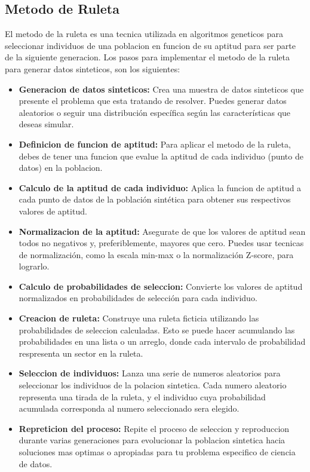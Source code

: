 \documentclass[12pt]{article}
\begin{document}
\subsection{Metodo de Ruleta}
El metodo de la ruleta es una tecnica utilizada en algoritmos geneticos para seleccionar individuos de una poblacion en funcion de su aptitud para ser parte de la siguiente generacion. Los pasos para implementar el metodo de la ruleta para generar datos sinteticos, son los siguientes:
\begin{itemize}
    \item \textbf{Generacion de datos sinteticos:} Crea una muestra de datos sinteticos que presente el problema que esta tratando de resolver. Puedes generar datos aleatorios o seguir una distribución específica según las características que deseas simular.
    \item \textbf{Definicion de funcion de aptitud:} Para aplicar el metodo de la ruleta, debes de tener una funcion que evalue la aptitud de cada individuo (punto de datos) en la poblacion.
    \item \textbf{Calculo de la aptitud de cada individuo:} Aplica la funcion de aptitud a cada punto de datos de la población sintética para obtener sus respectivos valores de aptitud.
    \item \textbf{Normalizacion de la aptitud:} Asegurate de que los valores de aptitud sean todos no negativos y, preferiblemente, mayores que cero. Puedes usar tecnicas de normalización, como la escala min-max o la normalización Z-score, para lograrlo.
    \item \textbf{Calculo de probabilidades de seleccion:} Convierte los valores de aptitud normalizados en probabilidades de selección para cada individuo.
    \item \textbf{Creacion de ruleta: } Construye una ruleta ficticia utilizando las probabilidades de seleccion calculadas. Esto se puede hacer acumulando las probabilidades en una lista o un arreglo, donde cada intervalo de probabilidad respresenta un sector en la ruleta.
    \item \textbf{Seleccion de individuos: } Lanza una serie de numeros aleatorios para seleccionar los individuos de la polacion sintetica. Cada numero aleatorio representa una tirada de la ruleta, y el individuo cuya probabilidad acumulada corresponda al numero seleccionado sera elegido.
    \item \textbf{Repreticion del proceso: } Repite el proceso de seleccion y reproduccion durante varias generaciones para evolucionar la poblacion sintetica hacia soluciones mas optimas o apropiadas para tu problema especifico de ciencia de datos. 
\end{itemize}
~\cite{De0a100enIA}
\end{document}
